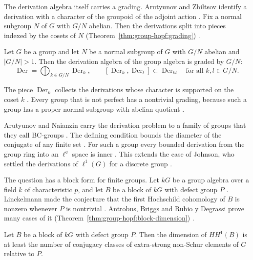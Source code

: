 The derivation algebra itself carries a grading. Arutyunov and Zhiltsov
identify a derivation with a character of the groupoid of the adjoint
action \cite[p.~1]{ArutyunovZhiltsov2023}. Fix a normal subgroup $N$ of $G$
with $G/N$ abelian. Then the derivations split into pieces indexed by the
cosets of $N$ (Theorem~\ref{thm:group-hopf:grading}) \cite[p.~1]{ArutyunovZhiltsov2023}.

\begin{theorem}\label{thm:group-hopf:grading}
Let $G$ be a group and let $N$ be a normal subgroup of $G$ with $G/N$
abelian and $|G/N|>1$. Then the derivation algebra of the group algebra is
graded by $G/N$:
\[
\operatorname{Der}=\bigoplus_{k\in G/N}\operatorname{Der}_{k},
\qquad
[\operatorname{Der}_{k},\operatorname{Der}_{l}]\subset\operatorname{Der}_{kl}
\quad\text{for all }k,l\in G/N .
\]
\end{theorem}

The piece $\operatorname{Der}_{k}$ collects the derivations whose character
is supported on the coset $k$ \cite[p.~1]{ArutyunovZhiltsov2023}. Every
group that is not perfect has a nontrivial grading, because such a group has
a proper normal subgroup with abelian quotient
\cite[p.~1]{ArutyunovZhiltsov2023}.

Arutyunov and Naianzin carry the derivation problem to a family of groups
that they call BC-groups \cite[p.~2]{ArutyunovNaianzin2023}. The defining
condition bounds the diameter of the conjugate of any finite set
\cite[p.~2]{ArutyunovNaianzin2023}. For such a group every bounded
derivation from the group ring into an $\ell^{q}$ space is inner
\cite[Theorem~2, p.~2]{ArutyunovNaianzin2023}. This extends the case of
Johnson, who settled the derivations of $\ell^{1}(G)$ for a discrete group
\cite[p.~2]{ArutyunovNaianzin2023}.

The question has a block form for finite groups. Let $kG$ be a group algebra
over a field $k$ of characteristic $p$, and let $B$ be a block of $kG$ with
defect group $P$ \cite[p.~2]{AntrobusBriggsRubioDegrassi2026}. Linckelmann
made the conjecture that the first Hochschild cohomology of $B$ is nonzero
whenever $P$ is nontrivial \cite[Conjecture, p.~2]{AntrobusBriggsRubioDegrassi2026}.
Antrobus, Briggs and Rubio y Degrassi prove many cases of it (Theorem~\ref{thm:group-hopf:block-dimension})
\cite[Theorem~B, p.~2]{AntrobusBriggsRubioDegrassi2026}.\begin{theorem}\label{thm:group-hopf:block-dimension}
Let $B$ be a block of $kG$ with defect group $P$. Then the dimension of
$HH^{1}(B)$ is at least the number of conjugacy classes of extra-strong
non-Schur elements of $G$ relative to $P$.
\end{theorem}

